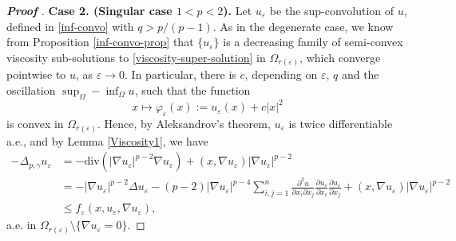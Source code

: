 \documentclass[12pt]{amsart}
\newcommand{\1}{\mathbf 1}
\begin{document}
\begin{proof}[\bf Proof ]
{\bf Case 2. (Singular case $1<p<2$).} Let $u_\varepsilon$ be the sup-convolution of $u$, defined in \eqref{inf-convo} with $q>p/{(p-1)}$.
As in the degenerate case, we know from Proposition \ref{inf-convo-prop}
that $\{u_\varepsilon\}$ is a decreasing family of semi-convex viscosity sub-solutions to \eqref{viscosity-super-solution} in $\Omega_{r(\varepsilon)}$, which converge pointwise to $u$, as $\varepsilon\rightarrow 0$. In particular, there is $c$, depending on $\varepsilon,\,q$ and the oscillation $\sup_{\Omega}-\inf_{\Omega} u$, such that the function
\begin{equation}\label{varphiq}
x\mapsto \varphi_\varepsilon(x):=u_\varepsilon (x)+c|x|^2
\end{equation}
is convex in $\Omega_{r(\varepsilon)}$.
Hence, by Aleksandrov's theorem, $u_\varepsilon$ is twice differentiable a.e., and by Lemma \ref{Viscosity1}, we have
\begin{align}\label{3-11}
-\Delta_{p,\gamma} u_\varepsilon&=-\mathrm{div}(|\nabla u_\varepsilon|^{p-2}\nabla u_\varepsilon)+(x,\nabla u_\varepsilon)|\nabla u_\varepsilon|^{p-2}\nonumber\\
&=-|\nabla u_\varepsilon|^{p-2} \Delta u_\varepsilon-(p-2)|\nabla u_\varepsilon|^{p-4}\sum_{i,j=1}^n  \frac{\partial^2 u}{\partial x_i \partial x_j}\frac{\partial u_\varepsilon}{\partial x_i} \frac{\partial u_\varepsilon}{\partial x_j}+(x,\nabla u_\varepsilon)|\nabla u_\varepsilon|^{p-2}\nonumber\\
&\leq f_\varepsilon(x,u_\varepsilon,\nabla u_\varepsilon),
\end{align}
a.e. in $\Omega_{r(\varepsilon)}\setminus \{\nabla u_\varepsilon=0 \}$.


\end{proof}
\end{document}
